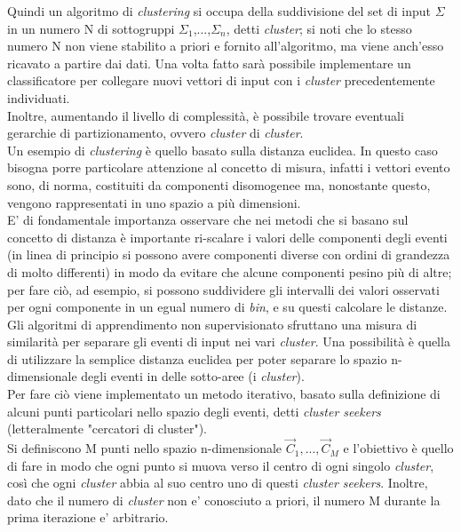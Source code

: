 Quindi un algoritmo di \textit{clustering} si occupa della suddivisione del set di input $\Sigma$ in un numero N di sottogruppi $\Sigma_1$,...,$\Sigma_n$, detti \textit{cluster}; si noti che lo stesso numero N non viene stabilito a priori e fornito all'algoritmo, ma viene anch'esso ricavato a partire dai dati. Una volta fatto sarà possibile implementare un classificatore per collegare nuovi vettori di input con i \textit{cluster} precedentemente individuati.\\
Inoltre, aumentando il livello di complessità, è possibile trovare eventuali gerarchie di partizionamento, ovvero \textit{cluster} di \textit{cluster}.\\
Un esempio di \textit{clustering} è quello basato sulla distanza euclidea. In questo caso bisogna porre particolare attenzione al concetto di misura, infatti i vettori evento sono, di norma, costituiti da componenti disomogenee ma, nonostante questo, vengono rappresentati in uno spazio a più dimensioni.\\
E' di fondamentale importanza osservare che nei metodi che si basano sul concetto di distanza è importante ri-scalare i valori delle componenti degli eventi (in linea di principio si possono avere componenti diverse con ordini di grandezza di molto differenti) in modo da evitare che alcune componenti pesino più di altre; per fare ciò, ad esempio, si possono suddividere gli intervalli dei valori osservati per ogni componente in un egual numero di \textit{bin}, e su questi calcolare le distanze. \\
Gli algoritmi di apprendimento non supervisionato sfruttano una misura di similarità per separare gli eventi di input nei vari \textit{cluster}. Una possibilità è quella di utilizzare la semplice distanza euclidea per poter separare lo spazio n-dimensionale degli eventi in delle sotto-aree (i \textit{cluster}). \\
Per fare ciò viene implementato un metodo iterativo, basato sulla definizione di alcuni punti particolari nello spazio degli eventi, detti \textit{cluster seekers} (letteralmente "cercatori di cluster"). \\
Si definiscono M punti nello spazio n-dimensionale $\vec{C}_{1},...,\vec{C}_{M}$ e l'obiettivo è quello di fare in modo che ogni punto si muova verso il centro di ogni singolo \textit{cluster}, così che ogni \textit{cluster} abbia al suo centro uno di questi \textit{cluster seekers}. Inoltre, dato che il numero di \textit{cluster} non e' conosciuto a priori, il numero M durante la prima iterazione e' arbitrario. \\
